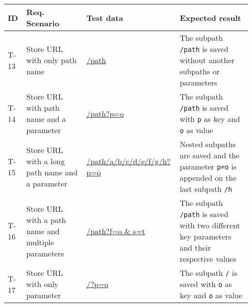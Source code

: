 \begin{tabularx}{\textwidth}{p{} p{} p{} p{}}
  \caption{Test definitions for URL}                                                                                                                                                                                                                                                                                                                   \\
  \toprule
  \textbf{ID} & \textbf{Req. Scenario}                             & \textbf{Test data}                    & \textbf{Expected result}                                                                                                                                                                                                                  \\
  \midrule
  T-13        & Store URL with only path name                      & \url{/path}                           & The subpath \texttt{/path} is saved without another subpaths or parameters                                                                                                                                                                \\
  \midrule
  T-14        & Store URL with path name and a parameter           & \url{/path?p=o}                       & The subpath \texttt{/path} is saved with \texttt{p} as key and \texttt{o} as value                                                                                                                                                        \\
  \midrule
  T-15        & Store URL with a long path name and a parameter    & \url{/path/a/b/c/d/e/f/g/h?p=o}       & Nested subpaths are saved and the parameter \texttt{p=o} is appended on the last subpath \texttt{/h}                                                                                                                                      \\
  \midrule
  T-16        & Store URL with a path name and multiple parameters & \url{/path?f=o                        & s=t}                                                                                                                                  & The subpath \texttt{/path} is saved with two different key parameters and their respective values \\
  \midrule
  T-17        & Store URL with only parameter                      & \url{/?p=o}                           & The subpath \texttt{/} is saved with \texttt{o} as key and \texttt{o} as value                                                                                                                                                            \\

\end{tabularx}
